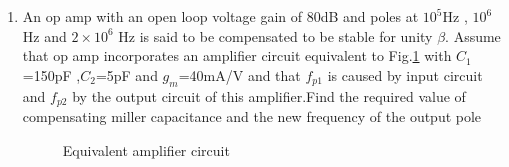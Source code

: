 \begin{enumerate}[label=\thesubsection.\arabic*.,ref=\thesubsection.\theenumi]
\item An op amp with an open loop voltage gain of 80dB and poles at $10^{5}$Hz , $10^{6}$ Hz and $2\times10^{6}$ Hz is said to be compensated to be stable for unity $\beta$. Assume that op amp incorporates an amplifier circuit equivalent to Fig.\ref{fig:Eqivalent circuit }  with $C_{1}$=150pF ,$C_{2}$=5pF and $g_{m}$=40mA/V and that $f_{p1}$ is caused by input circuit and $f_{p2}$ by the output circuit of this amplifier.Find the required value of compensating miller capacitance and the new frequency of the output pole

\begin{figure}[h!]
	\begin{center}
		\resizebox{\columnwidth/1}{!}{}
	\end{center}
	\caption{Equivalent amplifier circuit}
	\label{fig:Eqivalent circuit }
\end{figure}

\solution


\end{enumerate}
